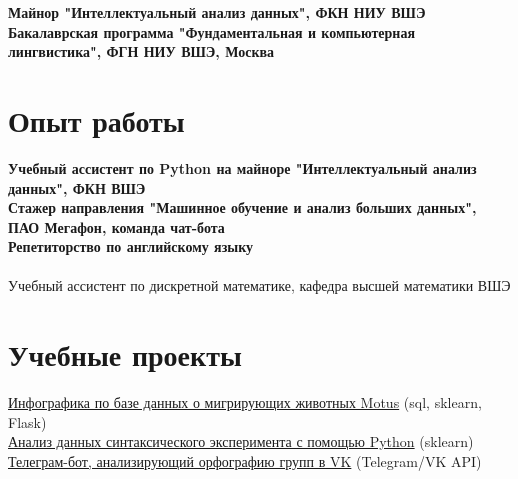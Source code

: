 \documentclass[11pt]{article} %
\begin{document}
\textbf{Майнор "Интеллектуальный анализ данных", ФКН НИУ ВШЭ}\\
\textbf{Бакалаврская программа "Фундаментальная и компьютерная лингвистика", ФГН НИУ ВШЭ, Москва}


\section*{Опыт работы}

 \textbf{Учебный ассистент по Python на майноре "Интеллектуальный анализ данных", ФКН ВШЭ}\\
 \textbf{Стажер направления "Машинное обучение и анализ больших данных", ПАО Мегафон, команда чат-бота}\\
 \textbf{Репетиторство по английскому языку}\\
\\
Учебный ассистент по дискретной математике, кафедра высшей математики ВШЭ




\section*{Учебные проекты}

\href{https://github.com/thddbptnsndshs/motustoday}{Инфографика по базе данных о мигрирующих животных Motus} (sql, sklearn, Flask)\\
\href{https://github.com/thddbptnsndshs/idioms}{Анализ данных синтаксического эксперимента с помощью Python} (sklearn)\\
\href{https://github.com/thddbptnsndshs/nlzlkskprdstvtljsclnhgrppncnvfrmvgrppvk}{Телеграм-бот, анализирующий орфографию групп в VK} (Telegram/VK API)\\
\end{document}
